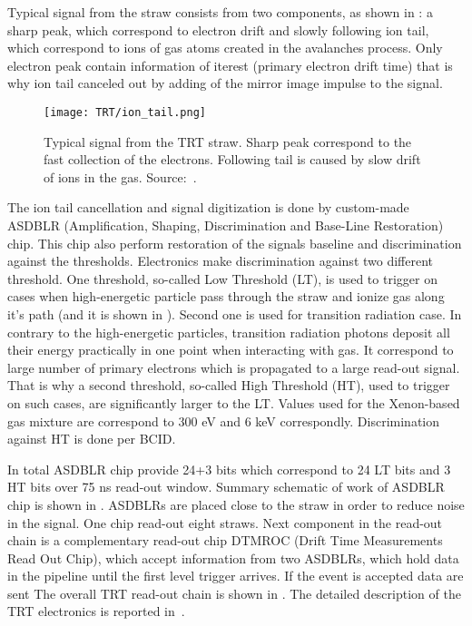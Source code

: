 Typical signal from the straw consists from two components, as shown in : 
a sharp peak, which correspond to electron drift and slowly following ion tail, which correspond to ions of gas atoms created in the avalanches process.
Only electron peak contain information of iterest (primary electron drift time) that is why ion tail canceled out by adding of the mirror image impulse to the signal.

\begin{figure}
\centering
\texttt{[image: TRT/ion\_tail.png]}
\caption{ 
 Typical signal from the TRT straw. Sharp peak correspond to the fast collection of the electrons. 
 Following tail is caused by slow drift of ions in the gas.
 Source:~\cite{ID_TDR_vol2}.
}
\label{fig:ion_tail}
\end{figure}

The ion tail cancellation and signal digitization is done by custom-made ASDBLR (Amplification, Shaping, Discrimination and Base-Line Restoration) chip. 
This chip also perform restoration of the signals baseline and discrimination against the thresholds. 
Electronics make discrimination against two different threshold. One threshold, so-called Low Threshold (LT), 
is used to trigger on cases when high-energetic particle pass through the straw and ionize gas along it's path (and it is shown in ).
Second one is used for transition radiation case.
In contrary to the high-energetic particles, transition radiation photons deposit all their energy practically in one point when interacting with gas.
It correspond to large number of primary electrons which is propagated to a large read-out signal.
That is why a second threshold, so-called High Threshold (HT), used to trigger on such cases, are significantly larger to the LT.
Values used for the Xenon-based gas mixture are correspond to 300 eV and 6 keV correspondly.
Discrimination against HT is done per BCID. 

In total ASDBLR chip provide 24+3 bits which correspond to 24 LT bits and 3 HT bits over 75 ns read-out window.
Summary schematic of work of ASDBLR chip is shown in .
ASDBLRs are placed close to the straw in order to reduce noise in the signal. One chip read-out eight straws.
Next component in the read-out chain is a complementary read-out chip DTMROC (Drift Time Measurements Read Out Chip), which accept 
information from two ASDBLRs, which hold data in the pipeline until the first level trigger arrives. If the event is accepted 
data are sent 
The overall TRT read-out chain is shown in . The detailed description of the TRT electronics is reported in~\cite{TRT_electronics}.

